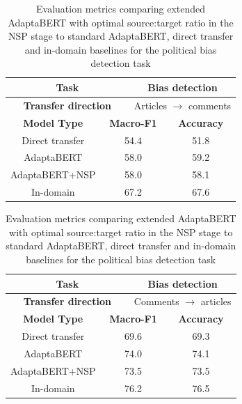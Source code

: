 \begin{table}[ht]
    \begin{center}
        \begin{tabular}{|c|c|c|c|c|c|}
            \hline
            \multicolumn{3}{|c|}{\textbf{Task}} & \multicolumn{3}{|c|}{Bias detection} \\
            \hline
            \multicolumn{3}{|c|}{\textbf{Transfer direction}} & \multicolumn{3}{|c|}{Articles $ \rightarrow $ comments} \\
            \hline \hline
            \multicolumn{2}{|c|}{\textbf{Model Type}} & \multicolumn{2}{|c|}{\textbf{Macro-F1}} & \multicolumn{2}{|c|}{\textbf{Accuracy}} \\
            \hline
            \multicolumn{2}{|c|}{Direct transfer} & \multicolumn{2}{|c|}{54.4} & \multicolumn{2}{|c|}{51.8} \\
            \multicolumn{2}{|c|}{AdaptaBERT} & \multicolumn{2}{|c|}{58.0} & \multicolumn{2}{|c|}{59.2} \\
            \multicolumn{2}{|c|}{AdaptaBERT+NSP} & \multicolumn{2}{|c|}{58.0} & \multicolumn{2}{|c|}{58.1} \\
            \hline
            \multicolumn{2}{|c|}{In-domain} & \multicolumn{2}{|c|}{67.2} & \multicolumn{2}{|c|}{67.6} \\
            \hline
        \end{tabular}
    \end{center} \vspace{10pt}
    \begin{center}
        \begin{tabular}{|c|c|c|c|c|c|}
            \hline
            \multicolumn{3}{|c|}{\textbf{Task}} & \multicolumn{3}{|c|}{Bias detection} \\
            \hline
            \multicolumn{3}{|c|}{\textbf{Transfer direction}} & \multicolumn{3}{|c|}{Comments $ \rightarrow $ articles} \\
            \hline \hline
            \multicolumn{2}{|c|}{\textbf{Model Type}} & \multicolumn{2}{|c|}{\textbf{Macro-F1}} & \multicolumn{2}{|c|}{\textbf{Accuracy}} \\
            \hline
            \multicolumn{2}{|c|}{Direct transfer} & \multicolumn{2}{|c|}{69.6} & \multicolumn{2}{|c|}{69.3}  \\
            \multicolumn{2}{|c|}{AdaptaBERT} & \multicolumn{2}{|c|}{74.0} & \multicolumn{2}{|c|}{74.1} \\
            \multicolumn{2}{|c|}{AdaptaBERT+NSP} & \multicolumn{2}{|c|}{73.5} & \multicolumn{2}{|c|}{73.5} \\
            \hline
            \multicolumn{2}{|c|}{In-domain} & \multicolumn{2}{|c|}{76.2} & \multicolumn{2}{|c|}{76.5}  \\
            \hline
        \end{tabular}
    \end{center}
    \caption{Evaluation metrics comparing extended AdaptaBERT with optimal source:target ratio in the NSP stage to standard AdaptaBERT, direct transfer and in-domain baselines for the political bias detection task}
    \label{tab:adaptabert-nsp-results-best}
\end{table}


